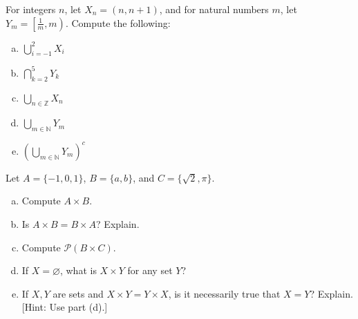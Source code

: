 \documentclass[11pt,letterpaper]{article}
\begin{document}
 For integers $n$, let $X_n= (n, n + 1)$, and for natural numbers $m$, let $Y_m= \left[ \frac{1}{m}, m \right)$. Compute the following:
	\begin{enumerate}[(a)]
	\item $\displaystyle \bigcup_{i= -1}^2 X_i$
	\item $\displaystyle \bigcap_{k=2}^5 Y_k$
	\item $\displaystyle \bigcup_{n \in \mathbb{Z}} X_n$
	\item $\displaystyle \bigcup_{m \in \mathbb{N}} Y_m$
	\item $\displaystyle \left( \bigcup_{m \in \mathbb{N}} Y_m \right)^c$
	\end{enumerate}



\newpage



 Let $A= \{ -1, 0, 1 \}$, $B= \{ a, b \}$, and $C= \{ \sqrt{2}, \pi \}$. 
	\begin{enumerate}[(a)]
	\item Compute $A \times B$.
	\item Is $A \times B= B \times A$? Explain. 
	\item Compute $\mathcal{P}(B \times C)$.
	\item If $X= \varnothing$, what is $X \times Y$ for any set $Y$?
	\item If $X, Y$ are sets and $X \times Y= Y \times X$, is it necessarily true that $X= Y$? Explain. [Hint: Use part (d).]
	\end{enumerate}
\end{document}
